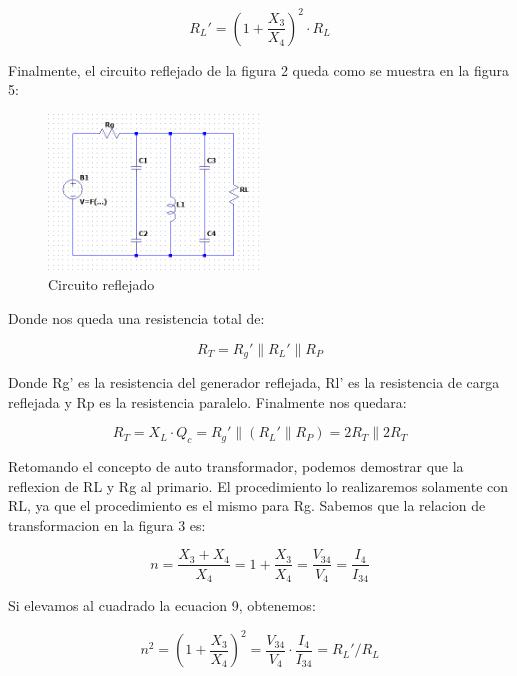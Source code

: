 \begin{equation}
    R_L' = (1 + \frac{X_3}{X_4})^2 \cdot R_L 
\end{equation}


Finalmente, el circuito reflejado de la figura 2 queda como se muestra en la figura 5:

\newpage
\begin{figure}[h]
    \centering
    \includegraphics[width=0.5\textwidth]{Imagenes/circuito_reflejado.png}
    \caption{Circuito reflejado}
\end{figure}



Donde nos queda una resistencia total de:

\begin{equation}
    R_T = R_g' \parallel R_L' \parallel R_P
\end{equation}

Donde Rg' es la resistencia del generador reflejada, Rl' es la resistencia de carga reflejada y Rp es la resistencia paralelo.
Finalmente nos quedara:

\begin{equation}
    R_T = X_L \cdot Q_c = R_g' \parallel (R_L' \parallel R_P) = 2 R_T \parallel 2 R_T 
\end{equation}

Retomando el concepto de auto transformador, podemos demostrar que la reflexion de RL y Rg al primario. El procedimiento lo realizaremos solamente con RL, ya que el procedimiento es el mismo para Rg.
Sabemos que la relacion de transformacion en la figura 3 es:

\begin{equation}
    n = \frac{X_3+X_4}{X_4} = 1 + \frac{X_3}{X_4} = \frac{V_{34}}{V_4} = \frac{I_4}{I_{34}}
\end{equation}

Si elevamos al cuadrado la ecuacion 9, obtenemos:

\begin{equation}
    n^2 = (1 + \frac{X_3}{X_4})^2 = \frac{V_{34}}{V_4} \cdot \frac{I_4}{I_{34}} = R_L' / R_L
\end{equation}

